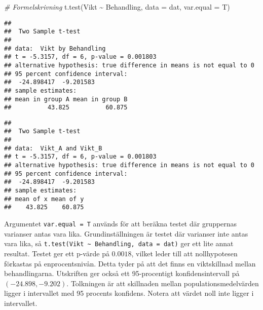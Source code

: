 \documentclass[
]{book}
\newenvironment{Shaded}{\begin{snugshade}}{\end{snugshade}}
\newcommand{\AttributeTok}[1]{\textcolor[rgb]{0.77,0.63,0.00}{#1}}
\newcommand{\CommentTok}[1]{\textcolor[rgb]{0.56,0.35,0.01}{\textit{#1}}}
\newcommand{\DocumentationTok}[1]{\textcolor[rgb]{0.56,0.35,0.01}{\textbf{\textit{#1}}}}
\newcommand{\FunctionTok}[1]{\textcolor[rgb]{0.00,0.00,0.00}{#1}}
\newcommand{\NormalTok}[1]{#1}
\newcommand{\OtherTok}[1]{\textcolor[rgb]{0.56,0.35,0.01}{#1}}
\newcommand{\SpecialCharTok}[1]{\textcolor[rgb]{0.00,0.00,0.00}{#1}}
\newcommand{\StringTok}[1]{\textcolor[rgb]{0.31,0.60,0.02}{#1}}
\theoremstyle{definition}
\theoremstyle{definition}
\theoremstyle{definition}
\theoremstyle{definition}
\theoremstyle{remark}
\begin{document}
\begin{Shaded}
\begin{Highlighting}[]
\CommentTok{\# Formelskrivning}
\FunctionTok{t.test}\NormalTok{(Vikt }\SpecialCharTok{\textasciitilde{}}\NormalTok{ Behandling, }\AttributeTok{data =}\NormalTok{ dat, }\AttributeTok{var.equal =}\NormalTok{ T)}
\end{Highlighting}
\end{Shaded}

\begin{verbatim}
## 
##  Two Sample t-test
## 
## data:  Vikt by Behandling
## t = -5.3157, df = 6, p-value = 0.001803
## alternative hypothesis: true difference in means is not equal to 0
## 95 percent confidence interval:
##  -24.898417  -9.201583
## sample estimates:
## mean in group A mean in group B 
##          43.825          60.875
\end{verbatim}

\begin{Shaded}
\end{Shaded}

\begin{verbatim}
## 
##  Two Sample t-test
## 
## data:  Vikt_A and Vikt_B
## t = -5.3157, df = 6, p-value = 0.001803
## alternative hypothesis: true difference in means is not equal to 0
## 95 percent confidence interval:
##  -24.898417  -9.201583
## sample estimates:
## mean of x mean of y 
##    43.825    60.875
\end{verbatim}

Argumentet \texttt{var.equal\ =\ T} används för att beräkna testet där gruppernas varianser antas vara lika. Grundinställningen är testet där varianser inte antas vara lika, så \texttt{t.test(Vikt\ \textasciitilde{}\ Behandling,\ data\ =\ dat)} ger ett lite annat resultat.
Testet ger ett p-värde på \(0.0018\), vilket leder till att nollhypotesen förkastas på enprocentsnivån. Detta tyder på att det finns en viktskillnad mellan behandlingarna. Utskriften ger också ett 95-procentigt konfidensintervall på \((-24.898, -9.202)\). Tolkningen är att skillnaden mellan populationsmedelvärden ligger i intervallet med 95 procents konfidens. Notera att värdet noll inte ligger i intervallet.
\end{document}
